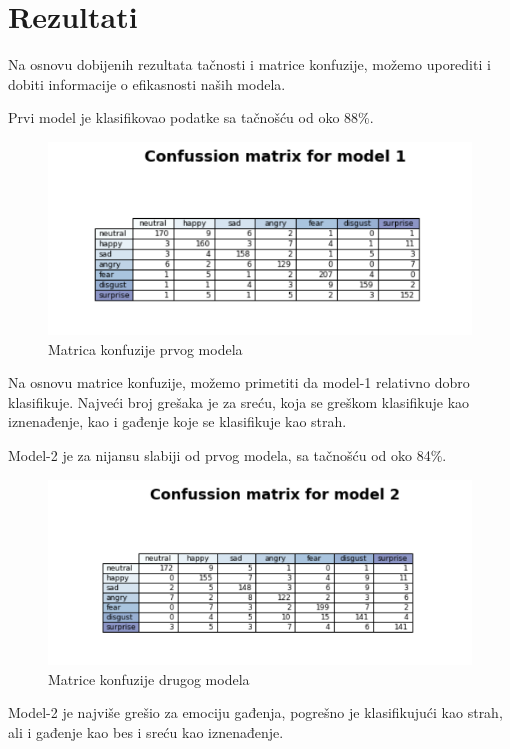 \documentclass{article}
\begin{document}
\newpage
\section {Rezultati}
Na osnovu dobijenih rezultata tačnosti i matrice konfuzije, možemo uporediti i dobiti informacije o efikasnosti naših modela.  

Prvi model je klasifikovao podatke sa tačnošću od oko 88\%. 

\begin{figure}[h]
\centering
\includegraphics[scale=0.8]{matrix1.png}
\caption{Matrica konfuzije prvog modela}
\end{figure}

Na osnovu matrice konfuzije, možemo primetiti da model-1 relativno dobro klasifikuje. Najveći broj grešaka je za sreću, koja se greškom klasifikuje kao iznenađenje, kao i gađenje koje se klasifikuje kao strah.

Model-2 je za nijansu slabiji od prvog modela, sa tačnošću od oko 84\%.

\begin{figure}[ht]
\centering
\includegraphics[scale=0.8]{matrix2.png}
\caption{Matrice konfuzije drugog modela}
\end{figure}
\newpage
Model-2 je najviše grešio za emociju gađenja, pogrešno je klasifikujući kao strah, ali i gađenje kao bes  i sreću kao iznenađenje.
\end{document}
